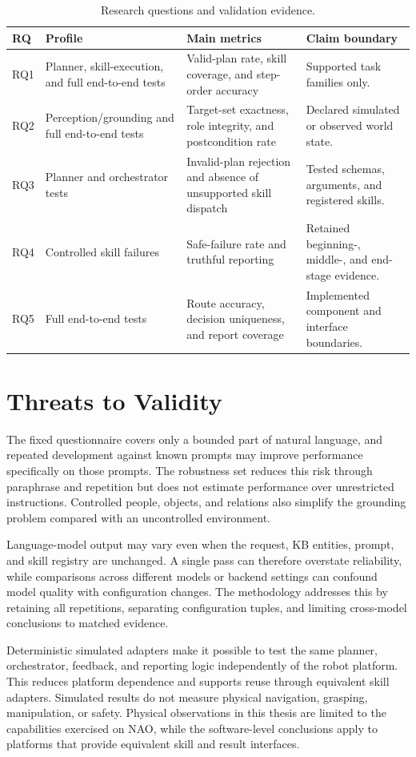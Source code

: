 \begin{table}[H]
\centering
\small
\renewcommand{\arraystretch}{1.14}
\caption{Research questions and validation evidence.}
\label{tab:rq-evidence-map}
\begin{tabularx}{\textwidth}{@{}p{}p{}p{}X@{}}
\toprule
\textbf{RQ} & \textbf{Profile} & \textbf{Main metrics} & \textbf{Claim boundary}\\
\midrule
RQ1 & Planner, skill-execution, and full end-to-end tests & Valid-plan rate, skill coverage, and step-order accuracy & Supported task families only.\\
RQ2 & Perception/grounding and full end-to-end tests & Target-set exactness, role integrity, and postcondition rate & Declared simulated or observed world state.\\
RQ3 & Planner and orchestrator tests & Invalid-plan rejection and absence of unsupported skill dispatch & Tested schemas, arguments, and registered skills.\\
RQ4 & Controlled skill failures & Safe-failure rate and truthful reporting & Retained beginning-, middle-, and end-stage evidence.\\
RQ5 & Full end-to-end tests & Route accuracy, decision uniqueness, and report coverage & Implemented component and interface boundaries.\\
\bottomrule
\end{tabularx}
\end{table}

\section{Threats to Validity}

The fixed questionnaire covers only a bounded part of natural language, and repeated development against known prompts may improve performance specifically on those prompts. The robustness set reduces this risk through paraphrase and repetition but does not estimate performance over unrestricted instructions. Controlled people, objects, and relations also simplify the grounding problem compared with an uncontrolled environment.

Language-model output may vary even when the request, KB entities, prompt, and skill registry are unchanged. A single pass can therefore overstate reliability, while comparisons across different models or backend settings can confound model quality with configuration changes. The methodology addresses this by retaining all repetitions, separating configuration tuples, and limiting cross-model conclusions to matched evidence.

Deterministic simulated adapters make it possible to test the same planner, orchestrator, feedback, and reporting logic independently of the robot platform. This reduces platform dependence and supports reuse through equivalent skill adapters. Simulated results do not measure physical navigation, grasping, manipulation, or safety. Physical observations in this thesis are limited to the capabilities exercised on NAO, while the software-level conclusions apply to platforms that provide equivalent skill and result interfaces.
